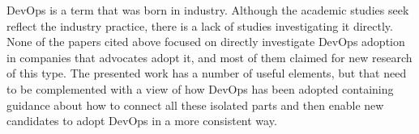 DevOps is a term that was born in industry. Although the academic studies seek
reflect the industry practice, there is a lack of studies investigating it
directly. None of the papers cited above focused on directly investigate
DevOps adoption in companies that advocates adopt it, and most of them claimed
for new research of this type. The presented work has a number of useful
elements, but that need to be complemented with a view of how DevOps has been
adopted containing guidance about how to connect all these isolated parts and
then enable new candidates to adopt DevOps in a more consistent way.
